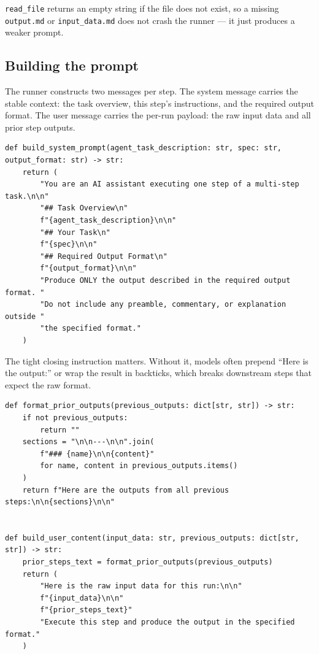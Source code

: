 \documentclass[12pt, a4paper]{article}
\begin{document}
\texttt{read\_file} returns an empty string if the file does not exist, so a missing \texttt{output.md} or \texttt{input\_data.md} does not crash the runner --- it just produces a weaker prompt.

\subsection{Building the prompt}

The runner constructs two messages per step. The system message carries the stable context: the task overview, this step's instructions, and the required output format. The user message carries the per-run payload: the raw input data and all prior step outputs.

\begin{lstlisting}[style=pythonstyle]
def build_system_prompt(agent_task_description: str, spec: str, output_format: str) -> str:
    return (
        "You are an AI assistant executing one step of a multi-step task.\n\n"
        "## Task Overview\n"
        f"{agent_task_description}\n\n"
        "## Your Task\n"
        f"{spec}\n\n"
        "## Required Output Format\n"
        f"{output_format}\n\n"
        "Produce ONLY the output described in the required output format. "
        "Do not include any preamble, commentary, or explanation outside "
        "the specified format."
    )
\end{lstlisting}

The tight closing instruction matters. Without it, models often prepend ``Here is the output:'' or wrap the result in backticks, which breaks downstream steps that expect the raw format.

\begin{lstlisting}[style=pythonstyle]
def format_prior_outputs(previous_outputs: dict[str, str]) -> str:
    if not previous_outputs:
        return ""
    sections = "\n\n---\n\n".join(
        f"### {name}\n\n{content}"
        for name, content in previous_outputs.items()
    )
    return f"Here are the outputs from all previous steps:\n\n{sections}\n\n"


def build_user_content(input_data: str, previous_outputs: dict[str, str]) -> str:
    prior_steps_text = format_prior_outputs(previous_outputs)
    return (
        "Here is the raw input data for this run:\n\n"
        f"{input_data}\n\n"
        f"{prior_steps_text}"
        "Execute this step and produce the output in the specified format."
    )
\end{lstlisting}
\end{document}
